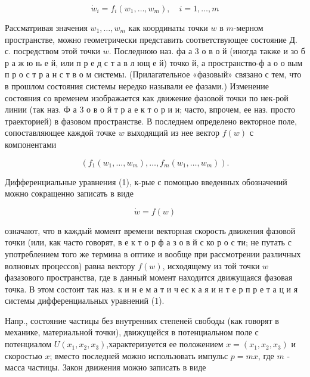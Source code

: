 \documentclass[10pt]{article}
\begin{document}
\[

\dot{w}_{i}=f_{i}\left(w_{1}, \ldots, w_{m}\right), \quad i=1, \ldots, m

\]



Рассматривая значения $w_{1}, \ldots, w_{m}$ как координаты точки $w$ в $m$-мерном пространстве, можно геометрически представить соответствующее состояние Д. с. посредством этой точки $w$. Последнюю наз. фа а 3 о в о й (иногда также и зо б р а ж ю њ е й, или п р е д с т а в л ющ е й) точко й, а пространство-ф а $о$ о вым п р о с т р а н с т в о м системы. (Прилагательное «фазовый» связано с тем, что в прошлом состояния системы нередко называли ее фазами.) Изменение состояния со временем изображается как движение фазовой точки по нек-рой линии (так наз. Ф а 3 о в о й т р а е к т о р и и; часто, впрочем, ее наз. просто траекторией) в фазовом пространстве. В последнем определено векторное поле, сопоставляющее каждой точке $w$ выходящий из нее вектор $f(w)$ с компонентами



\[

\left(f_{1}\left(w_{1}, \ldots, w_{m}\right), \ldots, f_{m}\left(w_{1}, \ldots, w_{m}\right)\right) .

\]



Дифференциальные уравнения (1), к-рые с помощью введенных обозначений можно сокращенно записать в виде



\[

\dot{w}=f(w)

\]



означают, что в каждый момент времени векторная скорость движения фазовой точки (или, как часто говорят, в е к т о р ф а з о в й с ко р о с ти; не путать с употреблением того же термина в оптике и вообще при рассмотрении различных волновых процессов) равна вектору $f(w)$, исходящему из той точки $w$ фазазового пространства, где в данный момент находится движущаяся фазовая точка. В этом состоит так наз. к и н е м а т и ч ес к а я и н т е р п р е т а ц и я системы дифференциальных уравнений (1).



Напр., состояние частицы без внутренних степеней свободы (как говорят в механике, материальной точки), движущейся в потенциальном поле с потенциалом $U\left(x_{1}, x_{2}, x_{3}\right)$,характеризуется ее положением $x=\left(x_{1}, x_{2}, x_{3}\right)$ и скоростью $x$; вместо последней можно использовать импульс $p=m x$, где $m$ - масса частицы. Закон движения можно записать в виде
\end{document}
